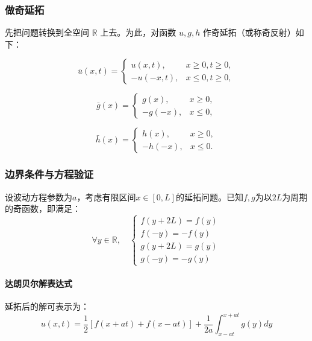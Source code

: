\documentclass[12pt,a4paper]{article}
\numberwithin{subsection}{section}
\numberwithin{subsubsection}{subsection}
\theoremstyle{plain}
\theoremstyle{definition}
\theoremstyle{remark}
\begin{document}
	\subsubsection{做奇延拓}
先把问题转换到全空间 \(\mathbb{R}\) 上去。为此，对函数 \(u, g, h\) 作奇延拓（或称奇反射）如下：
	
	\begin{equation}
		\bar{u}(x, t) = \begin{cases}
			u(x, t), & x \geq 0, t \geq 0, \\
			-u(-x, t), & x \leq 0, t \geq 0,
		\end{cases}
	\end{equation}
	
	\begin{equation}
		\bar{g}(x) = \begin{cases}
			g(x), & x \geq 0, \\
			-g(-x), & x \leq 0,
		\end{cases}
	\end{equation}
	
	\begin{equation}
		\bar{h}(x) = \begin{cases}
			h(x), & x \geq 0, \\
			-h(-x), & x \leq 0.
		\end{cases}
	\end{equation}
	
\subsubsection{边界条件与方程验证}
设波动方程参数为$a$，考虑有限区间$x \in [0, L]$的延拓问题。已知$f,g$为以$2L$为周期的奇函数，即满足：
\begin{equation}
	\forall y \in \mathbb{R},\quad 
	\begin{cases}
		f(y + 2L) = f(y) \\
		f(-y) = -f(y) \\
		g(y + 2L) = g(y) \\
		g(-y) = -g(y)
	\end{cases}
\end{equation}

\paragraph{达朗贝尔解表达式}
延拓后的解可表示为：
\begin{equation}
	u(x,t) = \frac{1}{2}[f(x + at) + f(x - at)] + \frac{1}{2a}\int_{x-at}^{x+at} g(y) dy
\end{equation}
\end{document}
